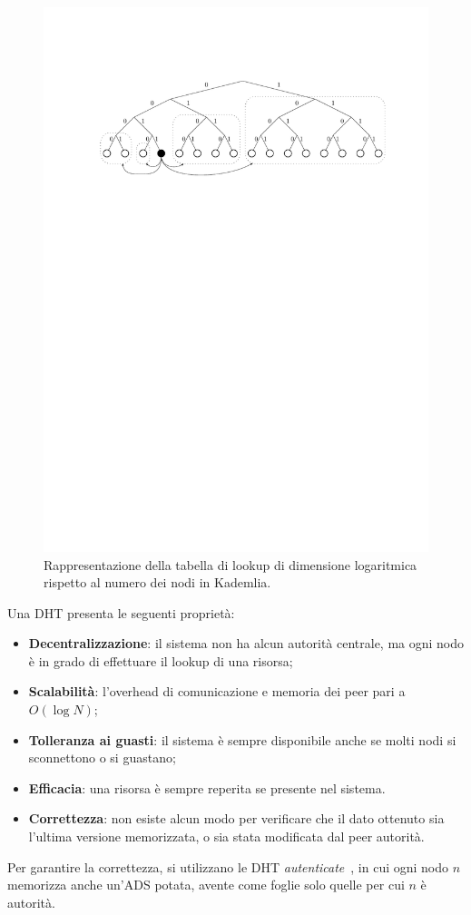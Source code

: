 \begin{figure}
	\centering
	\includegraphics[scale=0.87]{img/capuno/kademlia.pdf}
	\caption{Rappresentazione della tabella di lookup di dimensione logaritmica rispetto al numero dei nodi in Kademlia.}
	\label{fig:kademlia}
\end{figure}

Una DHT presenta le seguenti proprietà:

\begin{itemize}
	\item[\cmark] \textbf{Decentralizzazione}: il sistema non ha alcun autorità centrale, ma ogni nodo è in grado di effettuare il lookup di una risorsa;
	\item[\cmark] \textbf{Scalabilità}: l'overhead di comunicazione e memoria dei peer pari a $O(\log N)$;
	\item[\cmark] \textbf{Tolleranza ai guasti}: il sistema è sempre disponibile anche se molti nodi si sconnettono o si guastano;
	\item[\cmark] \textbf{Efficacia}: una risorsa è sempre reperita se presente nel sistema.
	\item[\xmark] \textbf{Correttezza}: non esiste alcun modo per verificare che il dato ottenuto sia l'ultima versione memorizzata, o sia stata modificata dal peer autorità.
\end{itemize}

Per garantire la correttezza, si utilizzano le DHT \emph{autenticate}~\cite{tamassia2011efficient, bernardini2019blockchains}, in cui ogni nodo $n$ memorizza anche un'ADS potata, avente come foglie solo quelle per cui $n$ è autorità.
